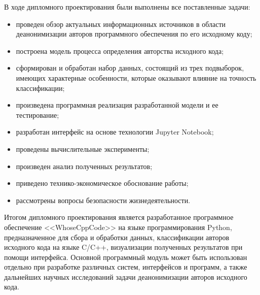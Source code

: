 В ходе дипломного проектирования были выполнены все поставленные задачи:
\begin{itemize}
 \item проведен обзор актуальных информационных источников в области деанонимизации
 авторов программного обеспечения по его исходному коду;
 \item построена модель процесса определения авторства исходного кода;
 \item сформирован и обработан набор данных, состоящий из трех подвыборок, имеющих характерные особенности,
 которые оказывают влияние на точность классификации;
 \item произведена программная реализация разработанной модели и ее тестирование;
 \item разработан интерфейс на основе технологии Jupyter Notebook;
 \item проведены вычислительные эксперименты;
 \item произведен анализ полученных результатов;
 \item приведено технико-экономическое обоснование работы;
 \item рассмотрены вопросы безопасности жизнедеятельности.
\end{itemize}

Итогом дипломного проектирования является разработанное программное обеспечение <<WhoseCppCode>> на языке
программирования Python, предназначенное для сбора и обработки данных,
классификации авторов исходного кода на языке C/C++,
визуализации полученных результатов при помощи интерфейса. Основной программный модуль может быть использован
отдельно при разработке различных систем, интерфейсов и программ, а также дальнейших
научных исследований задачи деанонимизации авторов исходного кода. 


